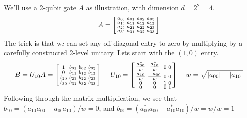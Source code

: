 We'll use a 2-qubit gate $A$ as illustration, with dimension $d=2^2=4$. 
\[
A = \begin{bsmallmatrix}
    a_{00} & a_{01} & a_{02} & a_{03} \\ 
    a_{10} & a_{11} & a_{12} & a_{13} \\
    a_{20} & a_{21} & a_{22} & a_{23} \\    
    a_{30} & a_{31} & a_{32} & a_{33}    
    \end{bsmallmatrix}
\]
The trick is that we can set any off-diagonal entry to zero by multiplying by a carefully constructed 2-level unitary. Lets start with the $(1,0)$ entry.
\[
B = U_{10} A = \begin{bsmallmatrix}
    1 & b_{01} & b_{02} & b_{03} \\ 
    0 & b_{11} & b_{12} & b_{13} \\
    b_{20} & b_{21} & b_{22} & b_{23} \\    
    b_{30} & b_{31} & b_{32} & b_{33}    
    \end{bsmallmatrix}
    \  \quad
 	U_{10} = \begin{bsmallmatrix}
    \tfrac{a^*_{00}}{w} & \tfrac{a^*_{10}}{w} & 0 & 0 \\ 
    \tfrac{a_{10}}{w} & \tfrac{-a_{00}}{w} & 0 & 0 \\
    0 & 0 & 1 & 0 \\    
    0 & 0 & 0 & 1    
    \end{bsmallmatrix}
\  \quad w = \sqrt{|a_{00}| + |a_{10}|}
\notag
\]
Following through the matrix multiplication, we see that $b_{10} = (a_{10}a_{00} - a_{00}a_{10})/w = 0$, and $b_{00} = 
 (a^*_{00}a_{00} - a^*_{10}a_{10})/w = w/w= 1$

